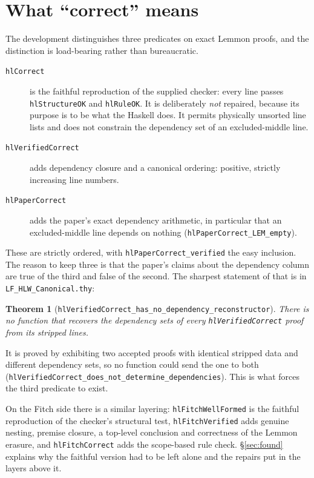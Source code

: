 \documentclass[11pt]{article}
\theoremstyle{plain}
\newtheorem*{theorem*}{Theorem}
\newcommand{\ubrk}{\_\discretionary{}{}{}}
\newcommand{\isa}[1]{\textup{\texttt{\small #1}}}
\newcommand{\thy}[1]{\textup{\texttt{\small #1}}}
\begin{document}
\section{What ``correct'' means}\label{sec:correct}

The development distinguishes three predicates on exact Lemmon proofs, and the
distinction is load-bearing rather than bureaucratic.

\begin{description}
\item[\isa{hlCorrect}] is the faithful reproduction of the supplied checker:
  every line passes \isa{hlStructureOK} and \isa{hlRuleOK}. It is deliberately
  \emph{not} repaired, because its purpose is to be what the Haskell does. It
  permits physically unsorted line lists and does not constrain the dependency
  set of an excluded-middle line.
\item[\isa{hlVerifiedCorrect}] adds dependency closure and a canonical
  ordering: positive, strictly increasing line numbers.
\item[\isa{hlPaperCorrect}] adds the paper's exact dependency arithmetic, in
  particular that an excluded-middle line depends on nothing
  (\isa{hlPaperCorrect\ubrk{}LEM\ubrk{}empty}).
\end{description}

\noindent
These are strictly ordered, with \isa{hlPaperCorrect\ubrk{}verified} the easy
inclusion. The reason to keep three is that the paper's claims about the
dependency column are true of the third and false of the second. The sharpest
statement of that is in \thy{LF\ubrk{}HLW\ubrk{}Canonical.thy}:

\begin{theorem*}[\isa{hlVerifiedCorrect\ubrk{}has\ubrk{}no\ubrk{}dependency\ubrk{}reconstructor}]
There is no function that recovers the dependency sets of every
\isa{hlVerifiedCorrect} proof from its stripped lines.
\end{theorem*}

\noindent
It is proved by exhibiting two accepted proofs with identical stripped data and
different dependency sets, so no function could send the one to both
(\isa{hlVerifiedCorrect\ubrk{}does\ubrk{}not\ubrk{}determine\ubrk{}dependencies}). This is what
forces the third predicate to exist.

On the Fitch side there is a similar layering: \isa{hlFitchWellFormed} is the
faithful reproduction of the checker's structural test, \isa{hlFitchVerified}
adds genuine nesting, premise closure, a top-level conclusion and correctness of
the Lemmon erasure, and \isa{hlFitchCorrect} adds the scope-based rule check.
\S\ref{sec:found} explains why the faithful version had to be left alone and the
repairs put in the layers above it.
\end{document}
